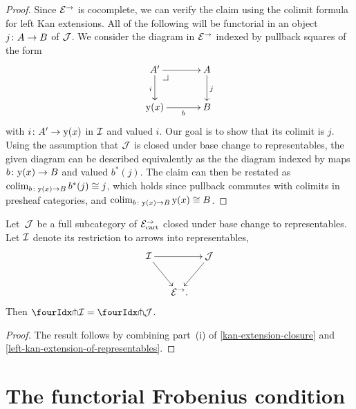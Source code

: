 \documentclass[reqno,10pt,a4paper,oneside,draft]{amsart}
\begin{document}
{{\begin{proof}
Since $\catE^\to$ is cocomplete, we can verify the claim using the colimit formula for left Kan extensions.
All of the following will be functorial in an object $j \co A \to B$ of $\cal{J}$.
We consider the diagram in $\catE^\to$ indexed by pullback squares of the form
\[
\xymatrix@C=1.2cm{
  A'
  \ar[r]
  \ar[d]_{i}
  \pullback{dr}
&
  A
  \ar[d]^{j}
\\
  \yon(x)
  \ar[r]_-{b}
&
  B
}
\]
with $i \co A' \to \yon(x)$ in $\cal{I}$ and valued $i$.
Our goal is to show that its colimit is $j$.
Using the assumption that $\cal{J}$ is closed under base change to representables, the given diagram can be described equivalently as the the diagram indexed by maps $b \co \yon(x) \to B$ and valued $b^*(j)$.
The claim can then be restated as $\colim_{b \co \yon(x) \to B} b^*(j) \iso j$, which holds since pullback commutes with colimits in presheaf categories, and $\colim_{b \co \yon(x) \to B} \yon(x) \iso B$.
\end{proof}

\begin{proposition} \label{awfs-on-arrows-into-representables}
Let~$\cal{J}$ be a full subcategory of $\catE_{\cart}^\to$ closed under base change to representables.
Let $\cal{I}$ denote its restriction to arrows into representables,
\[
\xymatrix@C-1em{
  \cal{I}
  \ar[rr]
  \ar[dr]
&&
  \cal{J}
  \ar[dl]
\\&
  \catE^\to
\rlap{.}}
\]
Then $\liftr{\cal{I}} = \liftr{\cal{J}}$.
\end{proposition}

\begin{proof}
The result follows by combining part~(i) of \cref{kan-extension-closure} and \cref{left-kan-extension-of-representables}.
\end{proof}

\section{The functorial Frobenius condition}
\label{sec:frobc}

}}
\end{document}
